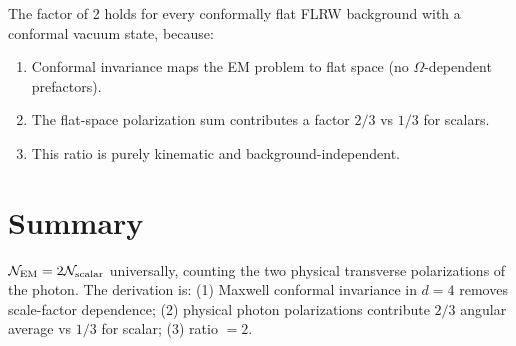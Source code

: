 \documentclass[12pt]{article}
\newcommand{\Nnum}{\mathcal{N}}
\begin{document}
The factor of 2 holds for every conformally flat FLRW background with a conformal
vacuum state, because:
\begin{enumerate}
\item Conformal invariance maps the EM problem to flat space (no $\Omega$-dependent prefactors).
\item The flat-space polarization sum contributes a factor $2/3$ vs $1/3$ for scalars.
\item This ratio is purely kinematic and background-independent.
\end{enumerate}

\section*{Summary}

$\Nnum_{\rm EM} = 2\Nnum_{\rm scalar}$ universally, counting the two physical transverse
polarizations of the photon.  The derivation is:
(1) Maxwell conformal invariance in $d=4$ removes scale-factor dependence;
(2) physical photon polarizations contribute $2/3$ angular average vs $1/3$ for scalar;
(3) ratio $= 2$.
\end{document}
